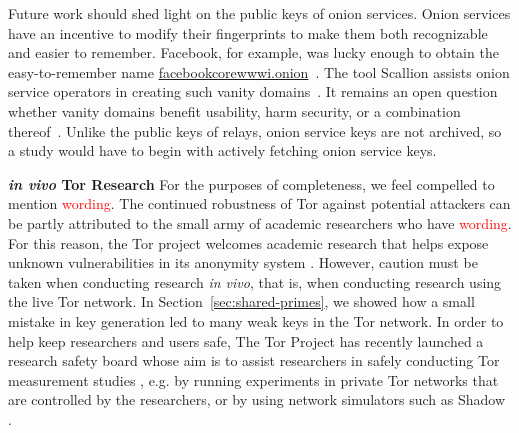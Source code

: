 Future work should shed light on the public keys of onion services.  Onion
services have an incentive to modify their fingerprints to make them both
recognizable and easier to remember.  Facebook, for example, was lucky enough to
obtain the easy-to-remember name \url{facebookcorewwwi.onion}~\cite{facebook}.
The tool Scallion assists onion service operators in creating such vanity
domains~\cite{scallion}.  It remains an open question whether vanity domains
benefit usability, harm security, or a combination
thereof~\cite{vanity-domains}.  Unlike the public keys of relays, onion service
keys are not archived, so a study would have to begin with actively fetching
onion service keys.

\textbf{\textit{in vivo} Tor Research} For the purposes of completeness, we feel compelled to mention \textcolor{red}{wording}. The continued robustness of Tor against potential attackers can be partly attributed to the small army of academic researchers who have \textcolor{red}{wording}. For this reason, the Tor project welcomes academic research that helps expose unknown vulnerabilities in its anonymity system \cite{torresearch}. However, caution must be taken when conducting research \textit{in vivo}, that is, when conducting research using the live Tor network. In Section~\ref{sec:shared-primes}, we showed how a small mistake in key generation led to many weak keys in the Tor network. In order to help keep researchers and users safe, The Tor Project has recently launched a research safety board whose aim is to assist researchers in safely conducting Tor measurement studies \cite{vanity-domains}, e.g. by running experiments in private Tor networks that are controlled by the researchers, or by using network simulators such as Shadow \cite{stem}.
